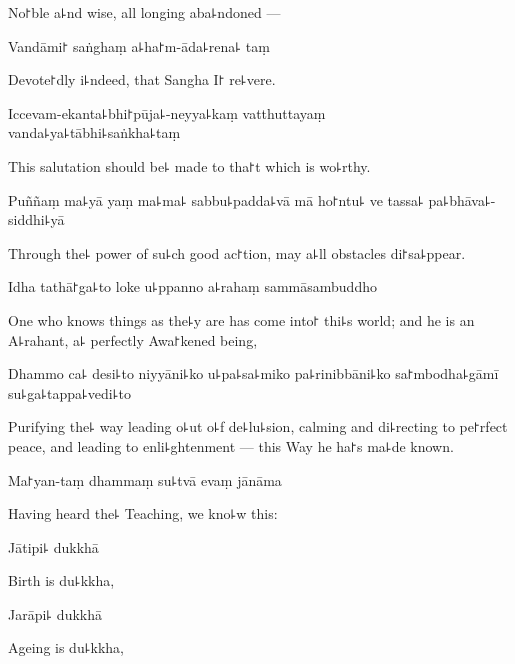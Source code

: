 \begin{english}
  No꜓ble a꜕nd wise, all longing aba꜕ndoned ---
\end{english}

Vandāmi꜓ saṅghaṃ a꜕ha꜓m-āda꜕rena꜕ taṃ

\begin{english}
  Devote꜓dly i꜕ndeed, that Sangha I꜓ re꜕vere.
\end{english}

Iccevam-ekanta꜕bhi꜓pūja꜕-neyya꜕kaṃ vatthuttayaṃ \\vanda꜕ya꜕tābhi꜕saṅkha꜕taṃ

\begin{english}
  This salutation should be꜕ made to tha꜓t which is wo꜕rthy.
\end{english}

Puññaṃ ma꜕yā yaṃ ma꜕ma꜕ sabbu꜕padda꜕vā mā ho꜓ntu꜕ ve tassa꜕ pa꜕bhāva꜕-siddhi꜕yā

\begin{english}
  Through the꜕ power of su꜕ch good ac꜓tion, may a꜕ll obstacles di꜓sa꜕ppear.
\end{english}

Idha tathā꜓ga꜕to loke u꜕ppanno a꜕rahaṃ sammāsambuddho

\begin{english}
  One who knows things as the꜕y are has come into꜓ thi꜕s world; and he is an A꜕rahant, a꜕ perfectly Awa꜓kened being,
\end{english}

Dhammo ca꜕ desi꜕to niyyāni꜕ko u꜕pa꜕sa꜕miko pa꜕rinibbāni꜕ko sa꜓mbodha꜕gāmī su꜕ga꜕tappa꜕vedi꜕to

\begin{english}
  Purifying the꜕ way leading o꜕ut o꜕f de꜕lu꜕sion, calming and di꜕recting to pe꜓rfect peace, and leading to enli꜕ghtenment --- this Way he ha꜓s ma꜕de known.
\end{english}

Ma꜓yan-taṃ dhammaṃ su꜕tvā evaṃ jānāma

\begin{english}
  Having heard the꜕ Teaching, we kno꜕w this:
\end{english}

Jātipi꜕ dukkhā

\begin{english}
  Birth is du꜕kkha,
\end{english}

Jarāpi꜕ dukkhā

\begin{english}
  Ageing is du꜕kkha,
\end{english}

